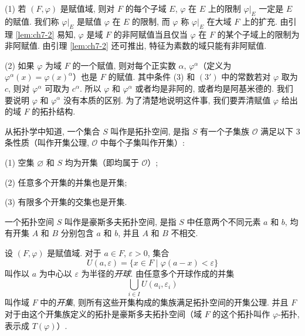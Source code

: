 \begin{remark}
(1) 若 $(F,\varphi)$ 是赋值域, 则对 $F$ 的每个子域 $E$, $\varphi$ 在 $E$ 上的限制 $\varphi|_E$ 一定是 $E$ 的赋值. 我们称 $\varphi|_E$ 是赋值 $\varphi$ 在 $E$ 的限制, 而 $\varphi$ 称 $\varphi|_E$ 在大域 $F$ 上的扩充. 由引理 \ref{lem:ch7-2} 易知, $\varphi$ 是域 $F$ 的非阿赋值当且仅当 $\varphi$ 在 $F$ 的某个子域上的限制为非阿赋值. 由引理 \ref{lem:ch7-2} 还可推出, 特征为素数的域只能有非阿赋值.

(2) 如果 $\varphi$ 为域 $F$ 的一个赋值, 则对每个正实数 $\alpha$, $\varphi^{\alpha}$（定义为 $\varphi^{\alpha}(x)=\varphi(x)^{\alpha}$）也是 $F$ 的赋值. 其中条件 (3) 和 $(3')$ 中的常数若对 $\varphi$ 取为 $c$, 则对 $\varphi^{\alpha}$ 可取为 $c^{\alpha}$. 所以 $\varphi$ 和 $\varphi^{\alpha}$ 或者均是非阿的, 或者均是阿基米德的. 我们要说明 $\varphi$ 和 $\varphi^{\alpha}$ 没有本质的区别. 为了清楚地说明这件事, 我们要弄清赋值 $\varphi$ 给出的域 $F$ 的拓扑结构.
\end{remark}

从拓扑学中知道, 一个集合 $S$ 叫作是拓扑空间, 是指 $S$ 有一个子集族 $\mathcal{O}$ 满足以下 $3$ 条性质（叫作开集公理, $\mathcal{O}$ 中每个子集叫作开集）:

(1) 空集 $\varnothing$ 和 $S$ 均为开集（即均属于 $\mathcal{O}$）;

(2) 任意多个开集的并集也是开集;

(3) 有限多个开集的交集也是开集.

一个拓扑空间 $S$ 叫作是豪斯多夫拓扑空间, 是指 $S$ 中任意两个不同元素 $a$ 和 $b$, 均有开集 $A$ 和 $B$ 分别包含 $a$ 和 $b$, 并且 $A$ 和 $B$ 不相交.

\begin{lemma}\label{lem:ch7-3}
设 $(F,\varphi)$ 是赋值域. 对于 $a\in F$, $\varepsilon>0$, 集合
\[
  U(a,\varepsilon)=\{x\in F\mid\varphi(a-x)<\varepsilon\}
\]
叫作以 $a$ 为中心以 $\varepsilon$ 为半径的\emph{开球}. 由任意多个开球作成的并集
\[
  \bigcup_{i\in I}U(a_i,\varepsilon_i)
\]
叫作域 $F$ 中的\emph{开集}, 则所有这些开集构成的集族满足拓扑空间的开集公理. 并且 $F$ 对于由这个开集族定义的拓扑是豪斯多夫拓扑空间（域 $F$ 的这个拓扑叫作 $\varphi$-拓扑, 表示成 $T(\varphi)$）.
\end{lemma}

